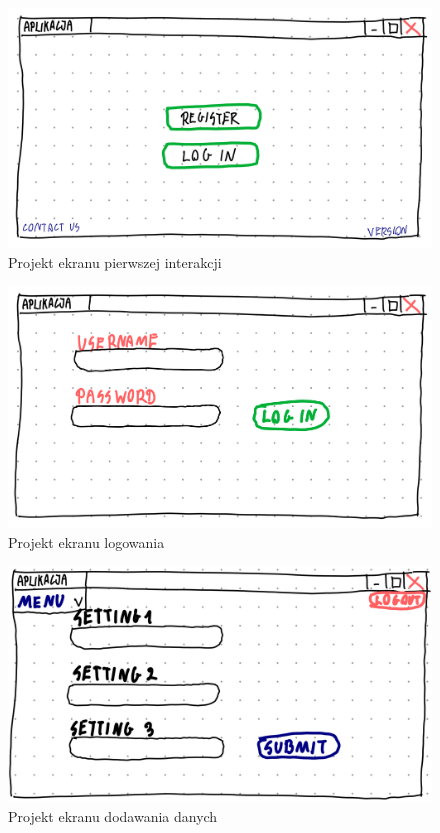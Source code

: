 \documentclass[a4paper, 10pt, twoside, openright]{report}
\begin{document}
\begin{large}
\begin{figure}[H]           %
    \centering
    \includegraphics[width=12cm]{figures/Righten_UI_sketch_startscreen.png}
    \caption{Projekt ekranu pierwszej interakcji}
    \label{fig:uiprojectstart}
\end{figure}

\begin{figure}[H]           %
    \centering
    \includegraphics[width=12cm]{figures/Righten_UI_sketch_loginscreen.png}
    \caption{Projekt ekranu logowania}
    \label{fig:uiprojectlogin}
\end{figure}

\begin{figure}[H]           %
    \centering
    \includegraphics[width=12cm]{figures/Righten_UI_sketch_settings.png}
    \caption{Projekt ekranu dodawania danych}
    \label{fig:uiprojectsettings}
\end{figure}


\end{large}
\end{document}
